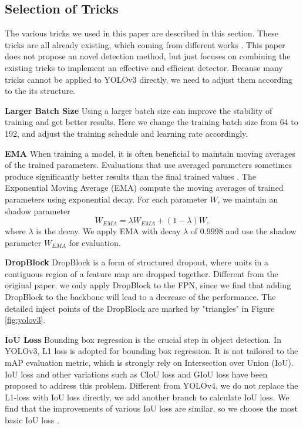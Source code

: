 \documentclass[10pt,twocolumn,letterpaper]{article}
\newcommand{\pheadB}[1] {\vspace{1mm}\noindent\textbf{#1}}
\begin{document}
	\subsection{Selection of Tricks}  \label{sec:tricks}
	The various tricks we used in this paper are described in this section. These tricks are all already existing, which coming from different works \cite{dropblock,yolov4,iouloss,iouaware,solov2,coordconv,spp}. This paper does not propose an novel detection method, but just focuses on combining the existing tricks to implement an effective and efficient detector. Because many tricks cannot be applied to YOLOv3 directly, we need to adjust them according to the its structure.
	
	\pheadB{Larger Batch Size}
	Using a larger batch size can improve the stability of training and get better results. Here we change the training batch size from 64 to 192, and adjust the training schedule and learning rate accordingly. 
	
	\pheadB{EMA} 
	When training a model, it is often beneficial to maintain moving averages of the trained parameters. Evaluations that use averaged parameters sometimes produce significantly better results than the final trained values  \cite{Mingxing2020EfficientDet}.
	The Exponential Moving Average (EMA) compute the moving averages of trained parameters using exponential decay. For each parameter $W$, we maintain an shadow parameter
	\begin{equation}
	W_{EMA} = \lambda W_{EMA} + (1 - \lambda) W,
	\end{equation}
	where $\lambda$ is the decay.  We apply EMA with decay $\lambda$ of $0.9998$ and use the shadow parameter $W_{EMA}$ for evaluation.
	
	\pheadB{DropBlock} \cite{dropblock}
	DropBlock is a form of structured dropout, where units in a contiguous region of a feature map are dropped together. Different from the original paper, we only apply DropBlock to the FPN, since we find that adding DropBlock to the backbone will lead to a decrease of the performance.
	The detailed inject points of the DropBlock are marked by "triangles" in Figure \ref{fig:yolov3}.
	
	\pheadB{IoU Loss} \cite{iouloss}
	Bounding box regression is the crucial step in object detection. In YOLOv3, L1 loss is adopted for bounding box regression. It is not tailored to the mAP evaluation metric, which is strongly rely on Intersection over Union (IoU). IoU loss and other variations such as CIoU loss and GIoU loss\cite{diouloss,giouloss} have been proposed to address this problem. Different from YOLOv4, we do not replace the L1-loss with IoU loss directly, we add another branch to calculate IoU loss. We find that the improvements of various IoU loss are similar, so we choose the most basic IoU loss \cite{iouloss}. 
	
\end{document}
